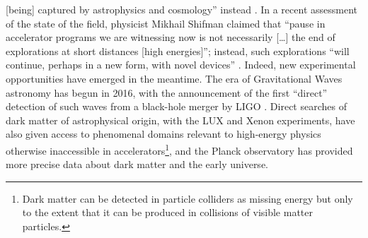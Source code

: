 \documentclass{article}
\begin{document}
[being] captured by astrophysics and cosmology'' instead \citep{Kosyakov2023}. In a recent assessment of the state of the field, physicist Mikhail Shifman claimed that ``pause in accelerator programs we are witnessing now is not necessarily [\dots] the end of explorations at short distances [high energies]''; instead, such explorations ``will continue, perhaps in a new form, with novel devices'' \citep{Shifman2020}. Indeed, new experimental opportunities have emerged in the meantime. The era of Gravitational Waves astronomy has begun in 2016, with the announcement of the first ``direct'' detection of such waves from a black-hole merger by LIGO \citep{Abbott2016}. Direct searches of dark matter of astrophysical origin, with the LUX and Xenon experiments, have also given access to phenomenal domains relevant to high-energy physics otherwise inaccessible in accelerators\footnote{Dark matter can be detected in particle colliders as missing energy but only to the extent that it can be produced in collisions of visible matter particles.}, and the Planck observatory \citep{planck2011planck} has provided more precise data about dark matter and the early universe. %
\end{document}
